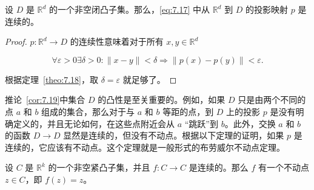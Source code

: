 \begin{corollary}\label{cor:7.19}
设 \(D\) 是 \({\mathbb{R}}^{d}\) 的一个非空闭凸子集。那么，\eqref{eq:7.17} 中从 \({\mathbb{R}}^{d}\) 到 \(D\) 的投影映射 \(p\) 是连续的。
\end{corollary}

\begin{proof}
\(p : {\mathbb{R}}^{d} \rightarrow  D\) 的连续性意味着对于所有 \(x,y \in  {\mathbb{R}}^{d}\)

\[
\forall \varepsilon  > 0\exists \delta  > 0 : \parallel x - y\parallel  < \delta  \Rightarrow  \parallel p\left( x\right)  - p\left( y\right) \parallel  < \varepsilon .
\]

根据定理~\ref{theo:7.18}，取 \(\delta  = \varepsilon\) 就足够了。
\end{proof}

推论~\ref{cor:7.19}中集合 \(D\) 的凸性是至关重要的。例如，如果 \(D\) 只是由两个不同的点 \(a\) 和 \(b\) 组成的集合，那么对于与 \(a\) 和 \(b\) 等距的点，到 \(D\) 上的投影 \(p\) 是没有明确定义的，并且无论如何，在这些点附近会从 \(a\) “跳跃”到 \(b\)。此外，交换 \(a\) 和 \(b\) 的函数 \(D \rightarrow  D\) 显然是连续的，但没有不动点。根据以下定理的证明，如果 \(p\) 是连续的，它应该有不动点。这个定理就是一般形式的布劳威尔不动点定理。

\begin{theorem}\label{theo:7.20}
设 \(C\) 是 \({\mathbb{R}}^{k}\) 的一个非空紧凸子集，并且 \(f : C \rightarrow  C\) 是连续的。那么 \(f\) 有一个不动点 \(z \in  C\)，即 \(f\left( z\right)  = z\)。
\end{theorem}

